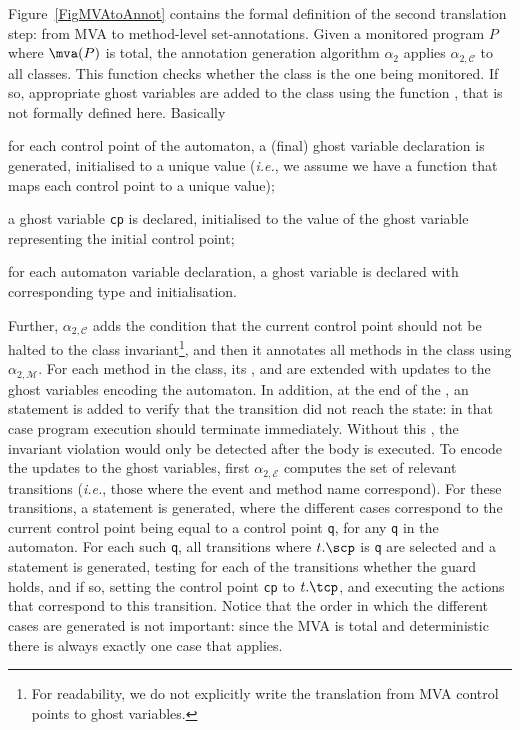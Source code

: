 Figure~\ref{FigMVAtoAnnot} contains the formal definition of the
second translation step: from MVA to method-level set-annotations.
Given a monitored program \(P\) where \(\mva(P)\) is total,
the annotation generation algorithm \(\alpha_2\) applies
\(\alpha_{2, \mathcal{C}}\) to all classes.
This function checks whether the class is the one being
monitored. If so, appropriate ghost variables are added to the class
using the function \newgvs, that is not formally defined here. Basically
\begin{inparaenum}
\item for each control point of the automaton, a (final) ghost
variable declaration is generated, initialised to a unique value
(\emph{i.e.}, we assume we have a function \unique that maps each
control point to a unique value);
\item a ghost variable \texttt{cp} is declared, initialised to the
value of the ghost variable representing the initial control point;
\item for each automaton variable declaration, a ghost variable is
declared with corresponding type and initialisation.
\end{inparaenum}
Further, \(\alpha_{2, \mathcal{C}}\) adds the condition that the
current control point should not be halted to the class
invariant\footnote{For readability, we do not explicitly write the
translation from MVA control points to ghost variables.}, and then it
annotates all methods in the class using \(\alpha_{2,
\mathcal{M}}\). For each method in the class, its \preset, \postset
and \excset are extended with updates to the ghost variables encoding
the automaton. In addition, at the end of the \preset, an \Assert
statement is added to verify that the transition did not reach the
\halted state: in that case program execution should terminate
immediately.  Without this \Assert, the invariant violation would only
be detected after the body is executed. To encode the updates to the
ghost variables, first \(\alpha_{2, \mathcal{E}}\) computes the set of
relevant transitions (\emph{i.e.}, those where the event and method
name correspond). For these transitions, a \CaseJML statement is
generated, where the different cases correspond to the current control
point being equal to a control point \texttt{q}, for any
\texttt{q} in the automaton. For each such \texttt{q}, all transitions
where \(t.\scp\) is \texttt{q} are selected and a \CaseJML
statement is generated, testing for each of the transitions whether
the guard holds, and if so, setting the control point \texttt{cp} to
\(t.\tcp\), and executing the actions that correspond to this
transition.
Notice that the order in which the different cases are generated is
not important: since the MVA is total and deterministic there is
always exactly one case that applies.

